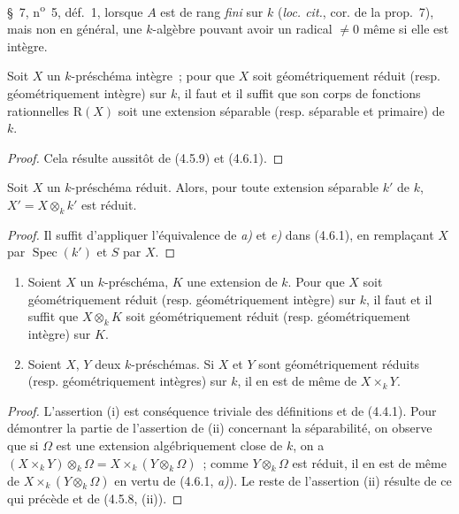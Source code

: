 \S~7, n\textsuperscript{o}~5, déf.~1, lorsque $A$ est de rang \emph{fini} sur
$k$ (\emph{loc. cit.}, cor. de la prop.~7), mais non en général, une $k$-algèbre
pouvant avoir un radical $\neq0$ même si elle est intègre.

\begin{corollary}[4.6.3]
\label{IV.2.4.6.3-fr}
Soit $X$ un $k$-préschéma intègre~; pour que $X$ soit géométriquement réduit
\textup{(resp.} géométriquement intègre\textup{)} sur $k$, il faut et il suffit que son corps de
fonctions rationnelles $\mathrm R(X)$ soit une extension séparable \textup{(resp.}
séparable et primaire\textup{)} de $k$.
\end{corollary}

\begin{proof}
Cela résulte aussitôt de (4.5.9) et (4.6.1).
\end{proof}

\begin{corollary}[4.6.4]
\label{IV.2.4.6.4-fr}
Soit $X$ un $k$-préschéma réduit. Alors, pour toute extension séparable $k'$ de
$k$, $X'=X\otimes_k k'$ est réduit.
\end{corollary}

\begin{proof}
Il suffit d'appliquer l'équivalence de \emph{a)} et \emph{e)} dans (4.6.1), en remplaçant
$X$ par $\operatorname{Spec}(k')$ et $S$ par $X$.
\end{proof}

\begin{proposition}[4.6.5]
\label{IV.2.4.6.5-fr}
\begin{enumerate}
\item[\textup{(i)}] Soient $X$ un $k$-préschéma, $K$ une extension de $k$. Pour que $X$
soit géométriquement réduit \textup{(resp.} géométriquement intègre\textup{)} sur $k$, il faut et
il suffit que $X\otimes_k K$ soit géométriquement réduit \textup{(resp.} géométriquement
intègre\textup{)} sur $K$.
\item[\textup{(ii)}] Soient $X$, $Y$ deux $k$-préschémas. Si $X$ et $Y$ sont
géométriquement réduits \textup{(resp.} géométriquement intègres\textup{)} sur $k$, il en est de
même de $X\times_k Y$.
\end{enumerate}
\end{proposition}

\begin{proof}
L'assertion (i) est conséquence triviale des définitions et de (4.4.1). Pour
démontrer la partie de l'assertion de (ii) concernant la séparabilité, on observe
que si $\Omega$ est une extension algébriquement close de $k$, on a
$(X\times_k Y)\otimes_k\Omega=X\times_k(Y\otimes_k\Omega)$~;
comme $Y\otimes_k\Omega$ est réduit, il en est de même de
$X\times_k(Y\otimes_k\Omega)$ en vertu de (4.6.1, \emph{a)}). Le reste de l'assertion
(ii) résulte de ce qui précède et de (4.5.8, (ii)).
\end{proof}

